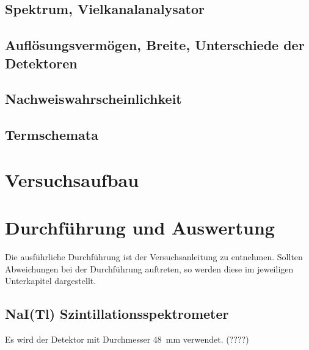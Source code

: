 \documentclass[11pt, a4paper]{article}
\numberwithin{equation}{section}
\begin{document}
\subsection{Spektrum, Vielkanalanalysator}

\subsection{Auflösungsvermögen, Breite, Unterschiede der Detektoren}

\subsection{Nachweiswahrscheinlichkeit}

\subsection{Termschemata}


\section{Versuchsaufbau}

\section{Durchführung und Auswertung}
Die ausführliche Durchführung ist der Versuchsanleitung \cite{anleitung} zu entnehmen.
Sollten Abweichungen bei der Durchführung auftreten, so werden diese im jeweiligen Unterkapitel dargestellt.

\subsection{NaI(Tl) Szintillationsspektrometer}
Es wird der Detektor mit Durchmesser \SI{48}{mm} verwendet. (????)
\end{document}
